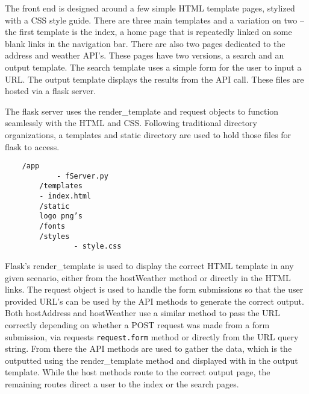 	The front end is designed around a few simple HTML template pages, stylized with a CSS style guide. There are three main templates and a variation on two – the first template is the index, a home page that is repeatedly linked on some blank links in the navigation bar. There are also two pages dedicated to the address and weather API’s. These pages have two versions, a search and an output template. The search template uses a simple form for the user to input a URL. The output template displays the results from the API call. These files are hosted via a flask server. \cite{grinberg2018flask}

	The flask server uses the render\_template and request objects to function seamlessly with the HTML and CSS. Following traditional directory organizations, a templates and static directory are used to hold those files for flask to access.
	\begin{verbatim}
	/app
    		- fServer.py
    	/templates
        - index.html
    	/static
		logo png’s
		/fonts
      	/styles
            	- style.css
	\end{verbatim}

    Flask’s render\_template is used to display the correct HTML template in any given scenario, either from the hostWeather method or directly in the HTML links. The request object is used to handle the form submissions so that the user provided URL’s can be used by the API methods to generate the correct output. Both hostAddress and hostWeather use a similar method to pass the URL correctly depending on whether a POST request was made from a form submission, via requests \verb|request.form| method or directly from the URL query string. From there the API methods are used to gather the data, which is the outputted using the render\_template method and displayed with in the output template. While the host methods route to the correct output page, the remaining routes direct a user to the index or the search pages. 

